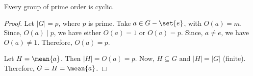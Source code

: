 \documentclass[11pt]{penrose}
\newcommand{\cyclic}[1]{\mean{#1}}
\begin{document}
\begin{ncor}
    Every group of prime order is cyclic.
\end{ncor}
\begin{proof}
    Let $|G| = p$, where $p$ is prime. Take $a \in G-\set{e}$, with $O(a) = m$. Since, $O(a) \mid p$, we have either $O(a) = 1$ or $O(a) = p$. Since, $a \neq e$, we have $O(a) \neq 1$. Therefore, $O(a) = p$.

    Let $H = \cyclic{a}$. Then $|H| = O(a) = p$. Now, $H \subseteq G$ and $|H| = |G|$ (finite). Therefore, $G = H = \cyclic{a}$.
\end{proof}
\end{document}
